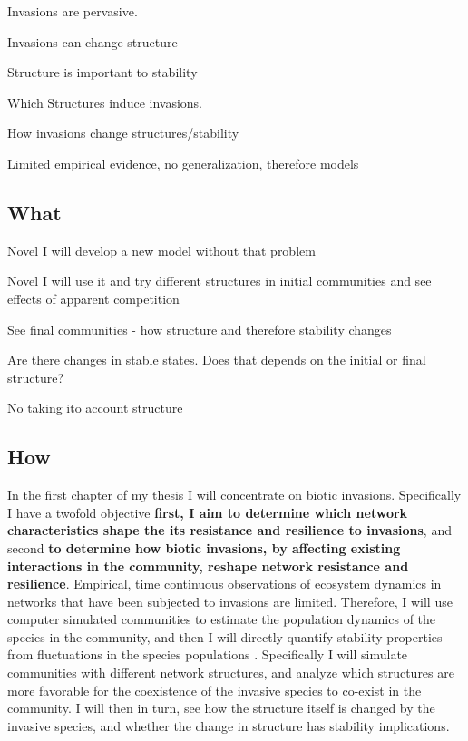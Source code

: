 \documentclass[a4paper]{article}
\begin{document}
Invasions are pervasive.

Invasions can change structure

Structure is important to stability

Which Structures induce invasions.

How invasions change structures/stability

Limited empirical evidence, no generalization, therefore models


\subsection*{What}

Novel I will develop a new model without that problem

Novel I will use it and try different structures in initial communities and see effects of apparent competition

See final communities - how structure and therefore stability changes

Are there changes in stable states. Does that depends on the initial or final structure?


No taking ito account structure



\subsection*{How}

In the first chapter of my thesis I will concentrate on biotic invasions.
Specifically I have a twofold objective \textbf{first, I aim to determine which network characteristics shape the its resistance and resilience to invasions}, and second \textbf{to determine how biotic invasions, by affecting existing interactions in the community, reshape network resistance and resilience}.
Empirical, time continuous observations of ecosystem dynamics in networks that have been subjected to invasions are limited.
Therefore, I will use computer simulated communities to estimate the population dynamics of the species in the community, and then I will directly quantify stability properties from fluctuations in the species populations \citep{Bastolla2009, Garcia-Algarra2013}.
Specifically I will simulate communities with different network structures, and analyze which structures are more favorable for the coexistence of the invasive species to co-exist in the community.
I will then in turn, see how the structure itself is changed by the invasive species, and whether the change in structure has stability implications.
\end{document}
